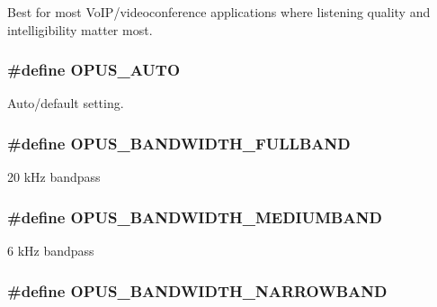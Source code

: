 Best for most VoIP/videoconference applications where listening quality and intelligibility matter most. \hypertarget{group__opus__ctlvalues_ga1c5b3244b018ff4548d2d6bffa418472}{
\subsubsection[{OPUS\_\-AUTO}]{\setlength{\rightskip}{0pt plus 5cm}\#define OPUS\_\-AUTO}}
\label{group__opus__ctlvalues_ga1c5b3244b018ff4548d2d6bffa418472}


Auto/default setting. \hypertarget{group__opus__ctlvalues_ga74cb052d8ec36cbcc9708c417558ebdd}{
\subsubsection[{OPUS\_\-BANDWIDTH\_\-FULLBAND}]{\setlength{\rightskip}{0pt plus 5cm}\#define OPUS\_\-BANDWIDTH\_\-FULLBAND}}
\label{group__opus__ctlvalues_ga74cb052d8ec36cbcc9708c417558ebdd}


20 kHz bandpass \hypertarget{group__opus__ctlvalues_ga53a2aff4dc0ee23682927ca568c422a3}{
\subsubsection[{OPUS\_\-BANDWIDTH\_\-MEDIUMBAND}]{\setlength{\rightskip}{0pt plus 5cm}\#define OPUS\_\-BANDWIDTH\_\-MEDIUMBAND}}
\label{group__opus__ctlvalues_ga53a2aff4dc0ee23682927ca568c422a3}


6 kHz bandpass \hypertarget{group__opus__ctlvalues_ga607dd310958b9c7d545d005e4572d47f}{
\subsubsection[{OPUS\_\-BANDWIDTH\_\-NARROWBAND}]{\setlength{\rightskip}{0pt plus 5cm}\#define OPUS\_\-BANDWIDTH\_\-NARROWBAND}}
\label{group__opus__ctlvalues_ga607dd310958b9c7d545d005e4572d47f}


